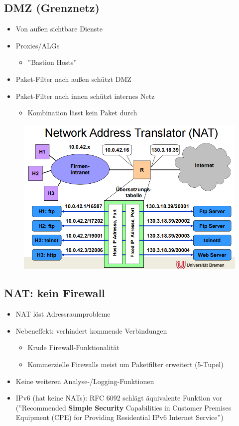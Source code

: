 \documentclass[openany]{book}
\begin{document}
\subsection{DMZ (Grenznetz)}

\begin{itemize}
    \item Von außen sichtbare Dienste
    \item Proxies/ALGs
    \begin{itemize}
        \item ''Bastion Hosts''
    \end{itemize}
    \item Paket-Filter nach außen schützt DMZ
    \item Paket-Filter nach innen schützt internes Netz
    \begin{itemize}
        \item Kombination lässt kein Paket durch
    \end{itemize}
\end{itemize}

\newpage

\begin{figure}[h!]
    \centering
    \includegraphics[width=0.85\linewidth]{Pics/NAT.PNG}
\end{figure}

\subsection{NAT: kein Firewall}

\begin{itemize}
    \item NAT löst Adressraumprobleme
    \item Nebeneffekt: verhindert kommende Verbindungen
    \begin{itemize}
        \item Krude Firewall-Funktionalität
        \item Kommerzielle Firewalls meist um Paketfilter erweitert (5-Tupel)
    \end{itemize}
    \item Keine weiteren Analyse-/Logging-Funktionen
    \item IPv6 (hat keine NATs): RFC 6092 schlägt äquivalente Funktion vor (''Recommended \textbf{Simple Security} Capabilities in Customer Premises Equipment (CPE) for Providing Residential IPv6 Internet Service'')
\end{itemize}
\end{document}

